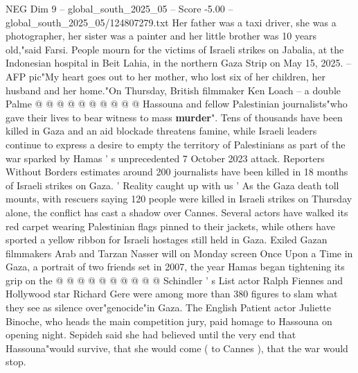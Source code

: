 \begin{textsample}{NEG Dim 9 – global\_south\_2025\_05 – Score -5.00 – global\_south\_2025\_05/124807279.txt}
Her father was a taxi driver, she was a photographer, her sister was a painter and her little brother was 10 years old,"said Farsi.
People mourn for the victims of Israeli strikes on Jabalia, at the Indonesian hospital in Beit Lahia, in the northern Gaza Strip on May 15, 2025. -- AFP pic"My heart goes out to her mother, who lost six of her children, her husband and her home."On Thursday, British filmmaker Ken Loach -- a double Palme @ @ @ @ @ @ @ @ @ @ Hassouna and fellow Palestinian journalists"who gave their lives to bear witness to mass \textbf{murder}".
Tens of thousands have been killed in Gaza and an aid blockade threatens famine, while Israeli leaders continue to express a desire to empty the territory of Palestinians as part of the war sparked by Hamas ' s unprecedented 7 October 2023 attack.
Reporters Without Borders estimates around 200 journalists have been killed in 18 months of Israeli strikes on Gaza. ' Reality caught up with us ' As the Gaza death toll mounts, with rescuers saying 120 people were killed in Israeli strikes on Thursday alone, the conflict has cast a shadow over Cannes.
Several actors have walked its red carpet wearing Palestinian flags pinned to their jackets, while others have sported a yellow ribbon for Israeli hostages still held in Gaza.
Exiled Gazan filmmakers Arab and Tarzan Nasser will on Monday screen Once Upon a Time in Gaza, a portrait of two friends set in 2007, the year Hamas began tightening its grip on the @ @ @ @ @ @ @ @ @ @ Schindler ' s List actor Ralph Fiennes and Hollywood star Richard Gere were among more than 380 figures to slam what they see as silence over"genocide"in Gaza.
The English Patient actor Juliette Binoche, who heads the main competition jury, paid homage to Hassouna on opening night.
Sepideh said she had believed until the very end that Hassouna"would survive, that she would come ( to Cannes ), that the war would stop.

\end{textsample}

